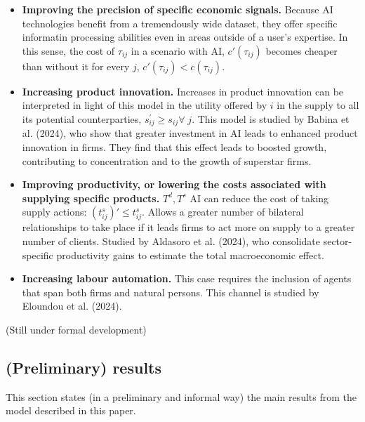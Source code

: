 \documentclass[
]{article}
\theoremstyle{definition}
\theoremstyle{plain}
\theoremstyle{remark}
\begin{document}
\begin{itemize}
\item
  \textbf{Improving the precision of specific economic signals.} Because
  AI technologies benefit from a tremendously wide dataset, they offer
  specific informatin processing abilities even in areas outside of a
  user's expertise. In this sense, the cost of \(\tau_{ij}\) in a
  scenario with AI, \(c'(\tau_{ij})\) becomes cheaper than without it
  for every \(j\), \(c'(\tau_{ij}) < c(\tau_{ij})\).
\item
  \textbf{Increasing product innovation.} Increases in product
  innovation can be interpreted in light of this model in the utility
  offered by \(i\) in the supply to all its potential counterparties,
  \(s_{ij}^{'} \geq s_{ij} \forall \; j\). This model is studied by
  Babina et al. (2024), who show that greater investment in AI leads to
  enhanced product innovation in firms. They find that this effect leads
  to boosted growth, contributing to concentration and to the growth of
  superstar firms.
\item
  \textbf{Improving productivity, or lowering the costs associated with
  supplying specific products.} \(T^d, T^s\) AI can reduce the cost of
  taking supply actions: \((t_{ij}^s)' \leq t_{ij}^s\). Allows a greater
  number of bilateral relationships to take place if it leads firms to
  act more on supply to a greater number of clients. Studied by Aldasoro
  et al. (2024), who consolidate sector-specific productivity gains to
  estimate the total macroeconomic effect.
\item
  \textbf{Increasing labour automation.} This case requires the
  inclusion of agents that span both firms and natural persons. This
  channel is studied by Eloundou et al. (2024).
\end{itemize}

(Still under formal development)

\subsection{(Preliminary) results}\label{preliminary-results}

This section states (in a preliminary and informal way) the main results
from the model described in this paper.
\end{document}
